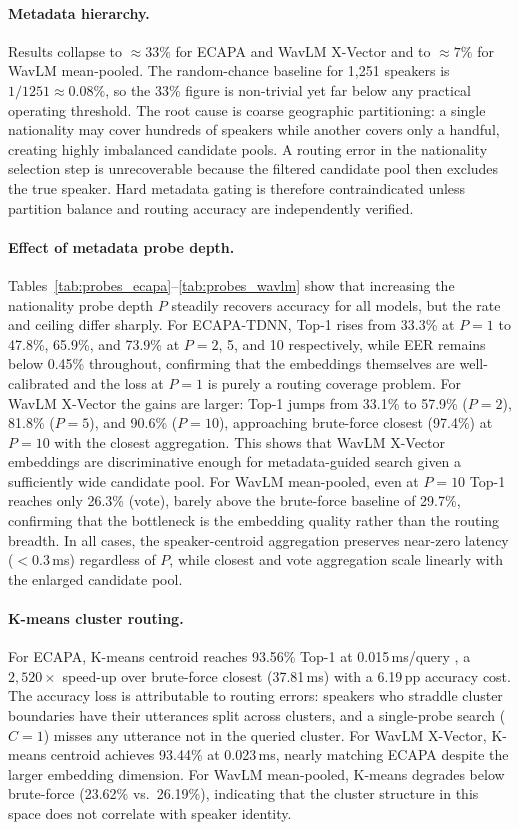 \documentclass[12pt, a4paper]{article}
\begin{document}
\paragraph{Metadata hierarchy.}
Results collapse to ${\approx}33\%$ for ECAPA and WavLM X-Vector
and to ${\approx}7\%$ for WavLM mean-pooled.
The random-chance baseline for 1,251 speakers is
$1/1251 \approx 0.08\%$, so the 33\% figure is non-trivial
yet far below any practical operating threshold.
The root cause is coarse geographic partitioning: a single nationality
may cover hundreds of speakers while another covers only a handful,
creating highly imbalanced candidate pools.
A routing error in the nationality selection step is unrecoverable
because the filtered candidate pool then excludes the true speaker.
Hard metadata gating is therefore contraindicated unless partition
balance and routing accuracy are independently verified.

\paragraph{Effect of metadata probe depth.}
Tables~\ref{tab:probes_ecapa}--\ref{tab:probes_wavlm} show that
increasing the nationality probe depth $P$ steadily recovers accuracy
for all models, but the rate and ceiling differ sharply.
For ECAPA-TDNN, Top-1 rises from 33.3\% at $P{=}1$ to 47.8\%,
65.9\%, and 73.9\% at $P{=}2$, 5, and 10 respectively, while EER
remains below 0.45\% throughout, confirming that the embeddings
themselves are well-calibrated and the loss at $P{=}1$ is purely a
routing coverage problem.
For WavLM X-Vector the gains are larger: Top-1 jumps from 33.1\%
to 57.9\% ($P{=}2$), 81.8\% ($P{=}5$), and 90.6\% ($P{=}10$),
approaching brute-force closest (97.4\%) at $P{=}10$ with the closest
aggregation.
This shows that WavLM X-Vector embeddings are discriminative enough
for metadata-guided search given a sufficiently wide candidate pool.
For WavLM mean-pooled, even at $P{=}10$ Top-1 reaches only 26.3\%
(vote), barely above the brute-force baseline of 29.7\%, confirming
that the bottleneck is the embedding quality rather than the routing
breadth.
In all cases, the speaker-centroid aggregation preserves near-zero
latency ($<$0.3\,ms) regardless of $P$, while closest and vote
aggregation scale linearly with the enlarged candidate pool.

\paragraph{K-means cluster routing.}
For ECAPA, K-means centroid reaches 93.56\% Top-1 at 0.015\,ms/query
, a $2{,}520{\times}$ speed-up over brute-force closest (37.81\,ms)
with a 6.19\,pp accuracy cost.
The accuracy loss is attributable to routing errors: speakers who
straddle cluster boundaries have their utterances split across clusters,
and a single-probe search ($C{=}1$) misses any utterance not in the
queried cluster.
For WavLM X-Vector, K-means centroid achieves 93.44\% at 0.023\,ms,
nearly matching ECAPA despite the larger embedding dimension.
For WavLM mean-pooled, K-means degrades below brute-force
(23.62\% vs.\ 26.19\%), indicating that the cluster structure in
this space does not correlate with speaker identity.
\end{document}
